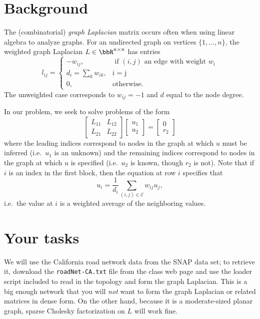 \documentclass[12pt, leqno]{article}
\begin{document}
\section*{Background}

The (combinatorial) {\em graph Laplacian} matrix occurs often when
using linear algebra to analyze graphs.  For an undirected graph on
vertices $\{1, \ldots, n\}$, the weighted graph
Laplacian $L \in \bbR^{n \times n}$ has entries
\[
  l_{ij} = \begin{cases}
    -w_{ij}, & \mbox{ if } (i,j) \mbox{ an edge with weight } w_i \\
    d_{i} = \sum_k w_{ik}, & \mbox{i = j} \\
    0, & \mbox{otherwise}.
  \end{cases}
\]
The unweighted case corresponds to $w_{ij} = -1$ and $d$ equal to the
node degree.

In our problem, we seek to solve problems of the form
\[
  \begin{bmatrix}
    L_{11} & L_{12} \\
    L_{21} & L_{22}
  \end{bmatrix}
  \begin{bmatrix} u_1 \\ u_2 \end{bmatrix} =
  \begin{bmatrix} 0 \\ r_2 \end{bmatrix}
\]
where the leading indices correspond to nodes in the graph at which
$u$ must be inferred (i.e.~$u_1$ is an unknown) and the remaining
indices correspond to nodes in the graph at which $u$ is specified
(i.e.~$u_2$ is known, though $r_2$ is not).  Note that if $i$ is an
index in the first block, then the equation at row $i$ specifies that
\[
  u_i = \frac{1}{d_i} \sum_{(i,j) \in \mathcal{E}} w_{ij} u_j,
\]
i.e.~the value at $i$ is a weighted average of the neighboring values.

\section*{Your tasks}

We will use the California road network data from the SNAP data set; to
retrieve it, download the {\tt roadNet-CA.txt} file from the class web
page and use the loader script included to read in the topology and form
the graph Laplacian. This is a big enough network that you will {\em
not} want to form the graph Laplacian or related matrices in dense form.
On the other hand, because it is a moderate-sized planar graph, sparse
Cholesky factorization on $L$ will work fine.
\end{document}
